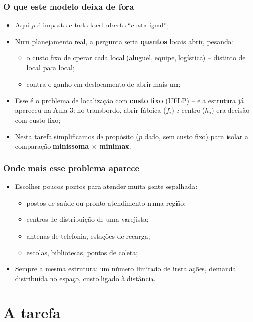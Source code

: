\documentclass[fleqn]{beamer}
\begin{document}
\begin{frame}
	\frametitle{O que este modelo deixa de fora}
	\begin{itemize}
		\item Aqui $p$ é imposto e todo local aberto ``custa igual'';
		\item Num planejamento real, a pergunta seria \textbf{quantos}
			locais abrir, pesando:
		\begin{itemize}
			\item o custo fixo de operar cada local (aluguel, equipe,
				logística) -- distinto de local para local;
			\item contra o ganho em deslocamento de abrir mais um;
		\end{itemize}
		\item Esse é o problema de localização com \textbf{custo fixo}
			(UFLP) -- e a estrutura já apareceu na Aula 3: no transbordo,
			abrir fábrica ($f_i$) e centro ($h_j$) era decisão com custo
			fixo;
		\item Nesta tarefa simplificamos de propósito ($p$ dado, sem
			custo fixo) para isolar a comparação \textbf{minissoma
			$\times$ minimax}.
	\end{itemize}
\end{frame}

\begin{frame}
	\frametitle{Onde mais esse problema aparece}
	\begin{itemize}
		\item Escolher poucos pontos para atender muita gente espalhada:
		\begin{itemize}
			\item postos de saúde ou pronto-atendimento numa região;
			\item centros de distribuição de uma varejista;
			\item antenas de telefonia, estações de recarga;
			\item escolas, bibliotecas, pontos de coleta;
		\end{itemize}
		\item Sempre a mesma estrutura: um número limitado de
			instalações, demanda distribuída no espaço, custo ligado à
			distância.
	\end{itemize}
\end{frame}

\section{A tarefa}
\end{document}
